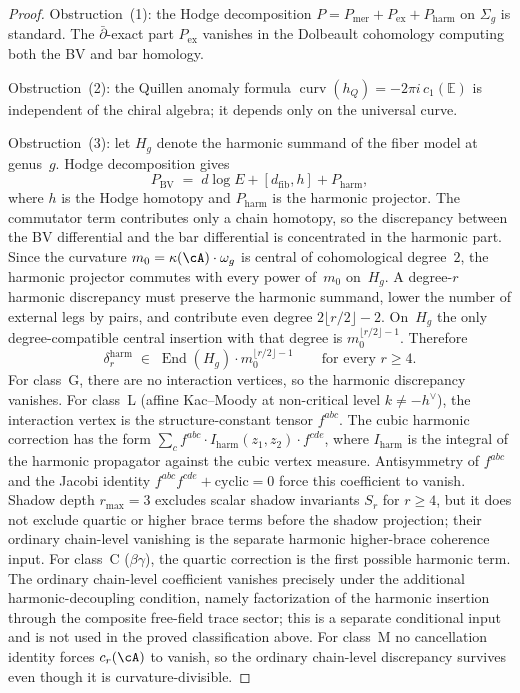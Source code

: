 \begin{proof}
Obstruction~(1): the Hodge decomposition
$P = P_{\mathrm{mer}} + P_{\mathrm{ex}} + P_{\mathrm{harm}}$
on $\Sigma_g$ is standard. The $\bar\partial$-exact part
$P_{\mathrm{ex}}$ vanishes in the Dolbeault cohomology
computing both the BV and bar homology.

Obstruction~(2): the Quillen anomaly formula
$\operatorname{curv}(h_Q) = -2\pi i\,c_1(\mathbb{E})$
\cite{Quillen85} is independent of the chiral algebra;
it depends only on the universal curve.

Obstruction~(3): let $H_g$ denote the harmonic summand of the
fiber model at genus~$g$. Hodge decomposition gives
\[
P_{\mathrm{BV}}
\;=\;
d\log E + [d_{\mathrm{fib}}, h] + P_{\mathrm{harm}},
\]
where $h$ is the Hodge homotopy and $P_{\mathrm{harm}}$ is the
harmonic projector. The commutator term contributes only a chain
homotopy, so the discrepancy between the BV differential and the
bar differential is concentrated in the harmonic part. Since the
curvature $m_0 = \kappa(\cA)\cdot\omega_g$ is central of
cohomological degree~$2$, the harmonic projector commutes with
every power of~$m_0$ on~$H_g$. A degree-$r$ harmonic discrepancy
must preserve the harmonic summand, lower the number of external
legs by pairs, and contribute even degree
$2\lfloor r/2 \rfloor - 2$. On~$H_g$ the only degree-compatible
central insertion with that degree is
$m_0^{\lfloor r/2 \rfloor - 1}$. Therefore
\[
\delta_r^{\mathrm{harm}}
\;\in\;
\operatorname{End}(H_g)\cdot m_0^{\lfloor r/2 \rfloor - 1}
\qquad\text{for every } r \geq 4.
\]
For class~G, there are no interaction vertices, so the harmonic
discrepancy vanishes. For class~L
\textup{(}affine Kac--Moody at non-critical level
$k \neq -h^\vee$\textup{)}, the interaction vertex is the
structure-constant tensor $f^{abc}$. The cubic harmonic
correction has the form
$\sum_c f^{abc}\cdot I_{\mathrm{harm}}(z_1,z_2)\cdot f^{cde}$,
where $I_{\mathrm{harm}}$ is the integral of the harmonic
propagator against the cubic vertex measure. Antisymmetry of
$f^{abc}$ and the Jacobi identity
$f^{abc}f^{cde} + \text{cyclic} = 0$ force this coefficient to
vanish. Shadow depth $r_{\max} = 3$ excludes scalar shadow
invariants \(S_r\) for \(r\geq4\), but it does not exclude
quartic or higher brace terms before the shadow projection; their
ordinary chain-level vanishing is the separate harmonic
higher-brace coherence input. For class~C
\textup{(}$\beta\gamma$\textup{)}, the quartic correction is the
first possible harmonic term. The ordinary chain-level coefficient
vanishes precisely under the additional harmonic-decoupling
condition, namely factorization of the harmonic insertion through the
composite free-field trace sector; this is a separate conditional
input and is not used in the proved classification above. For
class~M no cancellation identity forces
$c_r(\cA)$ to vanish, so the ordinary chain-level discrepancy
survives even though it is curvature-divisible.
\end{proof}

